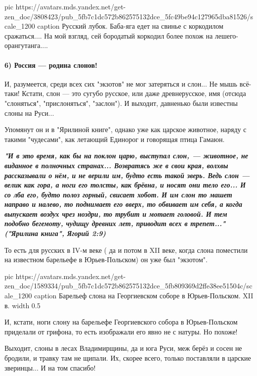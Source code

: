 \ifcmt
  pic https://avatars.mds.yandex.net/get-zen_doc/3808423/pub_5fb7c1dc572b862575132dce_5fc49be94c127965dba81526/scale_1200
	caption Русский лубок. Баба-яга едет на свинье с коркодилом сражаться.... На мой взгляд, сей бородатый коркодил более похож на лешего-орангутанга....
\fi

\paragraph{6) Россия — родина слонов!}

И, разумеется, среди всех сих "экзотов" не мог затеряться и слон... Не мышь
всё-таки! Кстати, слон — это сугубо русское, или даже древнерусское, имя
(отсюда "слоняться", "прислоняться", "заслон"). И выходит, давненько были
известны слоны на Руси...

Упомянут он и в "Ярилиной книге", однако уже как царское животное, наряду с
такими "чудесами", как летающий Единорог и говорящая птица Гамаюн. 

\begin{leftbar}
  \begingroup
    \em\large\bfseries\color{blue}
"И в это время, как бы на поклон царю, выступал слон, — животное, не виданное в
полночных странах... Возвратясь же в свои края, волхвы рассказывали о нём, и не
верили им, будто есть такой зверь. Ведь слон — велик как гора, а ноги его
толсты, как брёвна, и носят они тело его... И со лба его, будто полоз горный,
свисает хобот. И им слон то машет направо и налево, то поднимает его вверх, то
обвивает им себя, а когда выпускает воздух чрез ноздри, то трубит и мотает
головой. И тем подобно бегемоту, чудищу древних лет, приводит всех в трепет..."
("Ярилина книга", Ягорий 2:9)
  \endgroup
\end{leftbar}

То есть для русских в IV-м веке ( да и потом в XII веке, когда слона поместили
на известном барельефе в Юрьев-Польском) он уже был "экзотом". 

\ifcmt
  pic https://avatars.mds.yandex.net/get-zen_doc/1589334/pub_5fb7c1dc572b862575132dce_5fb809369d2ffe38ee51504c/scale_1200
	caption Барельеф слона на Георгиевском соборе в Юрьев-Польском. XII в.
	width 0.5
\fi

И, кстати, ноги слону на барельефе Георгиевского собора в Юрьев-Польском
приделали от грифона, то есть изображали его явно не с натуры. Но похоже!

Выходит, слоны в лесах Владимирщины, да и юга Руси, меж берёз и сосен не
бродили, и травку там не щипали. Их, скорее всего, только поставляли в царские
зверинцы... И на том спасибо!

